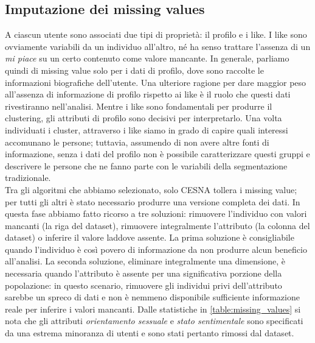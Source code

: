 \subsection{Imputazione dei missing values}
A ciascun utente sono associati due tipi di propriet\`a: il profilo e i like. I like sono ovviamente variabili da un individuo all'altro, n\'e ha senso trattare l'assenza di un \textit{mi piace} su un certo contenuto come valore mancante. In generale, parliamo quindi di missing value solo per i dati di profilo, dove sono raccolte le informazioni biografiche dell'utente. Una ulteriore ragione per dare maggior peso all'assenza di informazione di profilo rispetto ai like \`e il ruolo che questi dati rivestiranno nell'analisi. Mentre i like sono fondamentali per produrre il clustering, gli attributi di profilo sono decisivi per interpretarlo. Una volta individuati i cluster, attraverso i like siamo in grado di capire quali interessi accomunano le persone; tuttavia, assumendo di non avere altre fonti di informazione, senza i dati del profilo non \`e possibile caratterizzare questi gruppi e descrivere le persone che ne fanno parte con le variabili della segmentazione tradizionale.\\
Tra gli algoritmi che abbiamo selezionato, solo CESNA \cite{cesna} tollera i missing value; per tutti gli altri \`e stato necessario produrre una versione completa dei dati. In questa fase abbiamo fatto ricorso a tre soluzioni: rimuovere l'individuo con valori mancanti (la riga del dataset), rimuovere integralmente l'attributo (la colonna del dataset) o inferire il valore laddove assente. La prima soluzione \`e consigliabile quando l'individuo \`e cos\`i povero di informazione da non produrre alcun beneficio all'analisi. La seconda soluzione, eliminare integralmente una dimensione, \`e necessaria quando l'attributo \`e assente per una significativa porzione della popolazione: in questo scenario, rimuovere gli individui privi dell'attributo sarebbe un spreco di dati e non \`e nemmeno disponibile sufficiente informazione reale per inferire i valori mancanti. Dalle statistiche in \autoref{table:missing_values} si nota che gli attributi \textit{orientamento sessuale} e \textit{stato sentimentale} sono specificati da una estrema minoranza di utenti e sono stati pertanto rimossi dal dataset.
